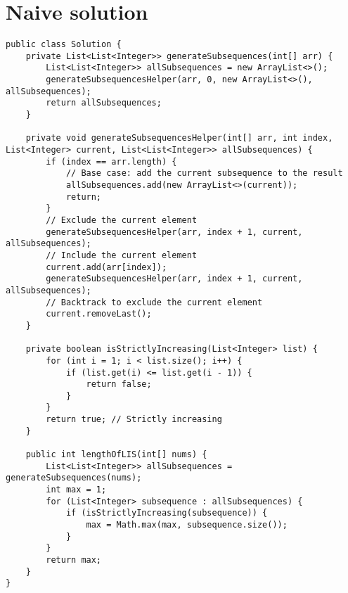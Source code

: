 \documentclass[11pt]{article}
\begin{document}
\section*{Naive solution}
\begin{lstlisting}    
public class Solution {
	private List<List<Integer>> generateSubsequences(int[] arr) {
		List<List<Integer>> allSubsequences = new ArrayList<>();
		generateSubsequencesHelper(arr, 0, new ArrayList<>(), allSubsequences);
		return allSubsequences;
	}
	
	private void generateSubsequencesHelper(int[] arr, int index, List<Integer> current, List<List<Integer>> allSubsequences) {
		if (index == arr.length) {
			// Base case: add the current subsequence to the result
			allSubsequences.add(new ArrayList<>(current));
			return;
		}		
		// Exclude the current element
		generateSubsequencesHelper(arr, index + 1, current, allSubsequences);		
		// Include the current element
		current.add(arr[index]);
		generateSubsequencesHelper(arr, index + 1, current, allSubsequences);		
		// Backtrack to exclude the current element
		current.removeLast();
	}
	
	private boolean isStrictlyIncreasing(List<Integer> list) {
		for (int i = 1; i < list.size(); i++) {
			if (list.get(i) <= list.get(i - 1)) {
				return false;
			}
		}
		return true; // Strictly increasing
	}
	
    public int lengthOfLIS(int[] nums) {
    	List<List<Integer>> allSubsequences = generateSubsequences(nums);
    	int max = 1;
    	for (List<Integer> subsequence : allSubsequences) {
    		if (isStrictlyIncreasing(subsequence)) {
    			max = Math.max(max, subsequence.size());
    		}
    	}
    	return max;
    }
}	
\end{lstlisting}    
\end{document}
